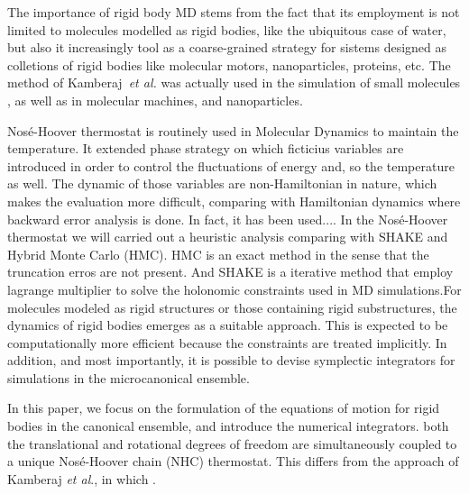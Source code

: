 \documentclass[aip,jcp,reprint,amsmath,amssymb]{revtex4-1}
\begin{document}
The importance of rigid body MD stems from the fact that its employment is not limited to molecules modelled as rigid bodies, like the ubiquitous case of water,  but also it increasingly tool as a coarse-grained strategy for sistems designed as colletions of rigid bodies like molecular motors, nanoparticles, proteins, etc. The method of Kamberaj~\textit{et al.}\cite{Kamberaj2005} was actually used in the simulation of small molecules\cite{Yan_2008,Akimov_2012,Geiger_2013} \cite{Aimoli_2014}, as well as in molecular machines,\cite{Akimov2008, Konyukhov2010} and nanoparticles.\cite{Knorowski2012, Patra2013}

Nos\'{e}-Hoover thermostat is routinely used in Molecular Dynamics to maintain the temperature. It extended phase strategy on which ficticius variables are introduced in order to control the fluctuations of energy and, so the temperature as well. The dynamic of those variables are non-Hamiltonian in nature, which makes the evaluation more difficult, comparing with Hamiltonian dynamics where backward error analysis is done. In fact, it has been used.... In the Nos\'{e}-Hoover thermostat we will carried out a heuristic analysis comparing with SHAKE and Hybrid Monte Carlo (HMC).\cite{Duane1987}  HMC is an exact method in the sense that the truncation erros are not present. And SHAKE is a iterative method that employ lagrange multiplier to solve the holonomic constraints used in MD simulations.For molecules modeled as rigid structures or those containing rigid substructures,\cite{Miller2002} the dynamics of rigid bodies emerges as a suitable approach. This is expected to be computationally more efficient because the constraints are treated implicitly. In addition, and most importantly, it is possible to devise symplectic integrators for simulations in the microcanonical ensemble.

In this paper, we focus on the formulation of the equations of motion for rigid bodies in the canonical ensemble, and introduce the numerical integrators. both the translational and rotational degrees of freedom are simultaneously coupled to a unique Nos\'e-Hoover chain (NHC) thermostat. This differs from the approach of Kamberaj \textit{et al}.,\cite{Kamberaj2005} in which . %
\end{document}
